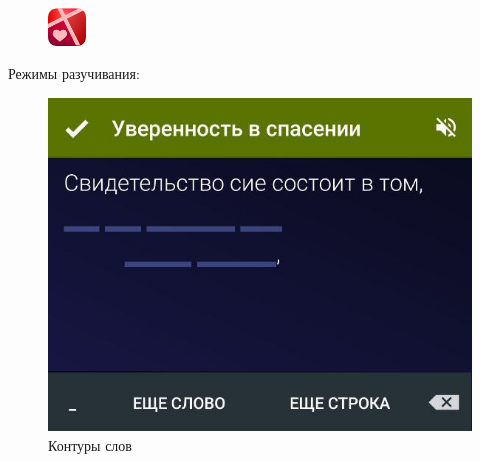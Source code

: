 \documentclass[t,aspectratio=169,14pt]{beamer}  %
\begin{document}
\begin{frame}[c]
\begin{multicols}{2}
	 \end{multicols}
\end{frame}
\begin{frame}[c]
	\frametitle{\insertsection}
	\begin{figure}
		\begin{flushright}
		\vspace{-1.5cm}
		\includegraphics[width=1cm]{remember-me-logo}
	\end{flushright}
		\end{figure}

	Режимы разучивания:
	 \begin{multicols}{2}
		\begin{center}
			\begin{figure}
			\includegraphics[height=0.55\textheight]{remember-me-card-hide-underscores}
			\caption{Контуры слов}
			\end{figure}
			\begin{figure}

\end{figure}
\end{center}
\end{multicols}
\end{frame}
\end{document}
